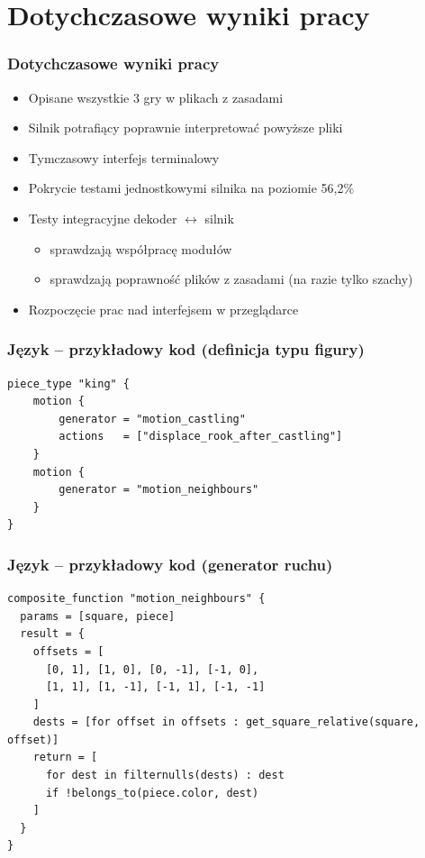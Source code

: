 \documentclass{beamer}
\begin{document}
\section{Dotychczasowe wyniki pracy}

\begin{frame}
	\frametitle{Dotychczasowe wyniki pracy}
	\begin{itemize}
		\item Opisane wszystkie 3 gry w plikach z zasadami
		\item Silnik potrafiący poprawnie interpretować powyższe pliki
		\item Tymczasowy interfejs terminalowy
		\item Pokrycie testami jednostkowymi silnika na poziomie 56,2\%
		\item Testy integracyjne dekoder $\leftrightarrow$ silnik
		      \begin{itemize}
			      \item sprawdzają współpracę modułów
			      \item sprawdzają poprawność plików z zasadami (na razie tylko szachy)
		      \end{itemize}
		\item Rozpoczęcie prac nad interfejsem w przeglądarce
	\end{itemize}
\end{frame}

\begin{frame}[fragile]
	\frametitle{Język -- przykładowy kod (definicja typu figury)}

	\begin{lstlisting}
piece_type "king" {
	motion {
		generator = "motion_castling"
		actions   = ["displace_rook_after_castling"]
	}
	motion {
		generator = "motion_neighbours"
	}
}
	\end{lstlisting}
\end{frame}

\begin{frame}[fragile]
	\frametitle{Język -- przykładowy kod (generator ruchu)}

	\begin{lstlisting}
composite_function "motion_neighbours" {
  params = [square, piece]
  result = {
    offsets = [
      [0, 1], [1, 0], [0, -1], [-1, 0],
      [1, 1], [1, -1], [-1, 1], [-1, -1]
    ]
    dests = [for offset in offsets : get_square_relative(square, offset)]
    return = [
      for dest in filternulls(dests) : dest
      if !belongs_to(piece.color, dest)
    ]
  }
}
	\end{lstlisting}
\end{frame}
\end{document}
